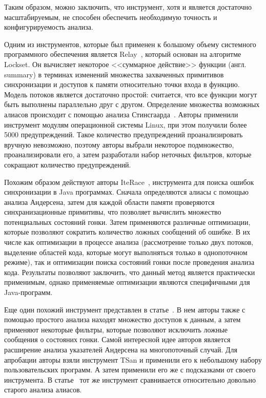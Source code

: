 Таким образом, можно заключить, что инструмент, хотя и является достаточно масштабируемым, не способен обеспечить необходимую точность и конфигурируемость анализа.

Одним из инструментов, которые был применен к большому объему системного программного обеспечения является Relay~\cite{Relay}, который основан на алгоритме Lockset.
Он вычисляет некоторое <<суммарное действие>> функции (англ. summary) в терминах изменений множества захваченных примитивов синхронизации и доступов к памяти относительно точки входа в функцию.
Модель потоков является достаточно простой: считается, что все функции могут быть выполнены параллельно друг с другом.
Определение множества возможных алиасов происходит с помощью анализа Стинсгаарда~\cite{Steensgaard:1996}.
Авторы применили инструмент модулям операционной системы Linux, при этом получили более 5000 предупреждений.
Такое количество предупреждений проанализировать вручную невозможно, поэтому авторы выбрали некоторое подмножество, проанализировали его, а затем разработали набор неточных фильтров, которые сокращают количество предупреждений.

Похожим образом действуют авторы IteRace~\cite{Radoi:2015:ETS}, инструмента для поиска ошибок синхронизации в Java программах.
Сначала определяются алиасы с помощью анализа Андерсена, затем для каждой области памяти проверяются синхранизационные примитивы, что позволяет вычислить множество потенциальных состояний гонки.
Затем применяются различные оптимизации, которые позволяют сократить количество ложных сообщений об ошибке.
В их числе как оптимизации в процессе анализа (рассмотрение только двух потоков, выделение областей кода, которые могут выполняться только в однопоточном режиме), так и оптимизации поиска состояний гонки после проведения анализа кода.
Результаты позволяют заключить, что данный метод является практически применимым, однако применяемые оптимизации являются специфичными для Java-программ.

Еще один похожий инструмент представлен в статье~\cite{Di:2016:ADD}.
В нем авторы также с помощью простого анализа находят множество доступов к данным, а затем применяют некоторые фильтры, которые позволяют исключить ложные сообщения о состояних гонки.
Самой интересной идее авторов является расширение анализа указателей Андерсена на многопоточный случай.
Для апробации авторы взяли инструмент TSan и применили его к небольшому набору пользовательских программ. 
А затем применили его же с подсказками от своего инструмента. 
В статье~\cite{Sui:2016} тот же инструмент сравнивается относительно довольно старого анализа алиасов.


